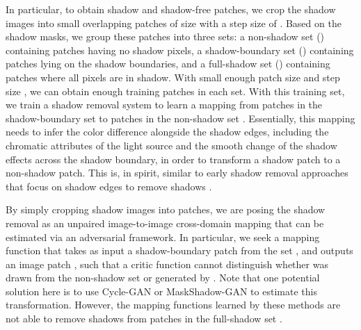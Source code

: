 \documentclass[runningheads]{llncs}
\begin{document}
In particular, to obtain shadow and shadow-free patches, we crop the shadow images into small overlapping patches of size  with a step size of . Based on the shadow masks, we group these patches into three sets: a non-shadow set () containing patches having no shadow pixels, a shadow-boundary set () containing patches lying on the shadow boundaries, and a full-shadow set () containing patches where all pixels are in shadow.
With small enough patch size  and  step size , we can obtain enough training patches in each set. With this training set, we train a shadow removal system to learn a mapping  from patches in the shadow-boundary set  to patches in the non-shadow set . Essentially, this mapping needs to infer the color difference alongside the shadow edges, including the chromatic attributes of the light source and the smooth change of the shadow effects across the shadow boundary, in order to transform a shadow patch to a non-shadow patch.
This is, in spirit, similar to early shadow removal approaches that focus on shadow edges to remove shadows \cite{shadow_edge,Finlayson02,Finlayson06,Vicente-etal-PAMI18,vicentesingle}.



By simply cropping shadow images into patches, we are posing the shadow removal as an unpaired image-to-image cross-domain mapping \cite{Yi2017DualGANUD,Choi2017StarGANUG,Liu2017UnsupervisedIT} that can be estimated via an adversarial framework. In particular, we seek a mapping function  that takes as input a shadow-boundary patch  from the set , and outputs an image patch , such that a critic function  cannot distinguish whether   was drawn from the non-shadow set  or  generated by . Note that one potential solution here is to use Cycle-GAN or MaskShadow-GAN to estimate this transformation. However, the mapping functions learned by these methods are not able to remove shadows from patches in the full-shadow set .  
\end{document}
